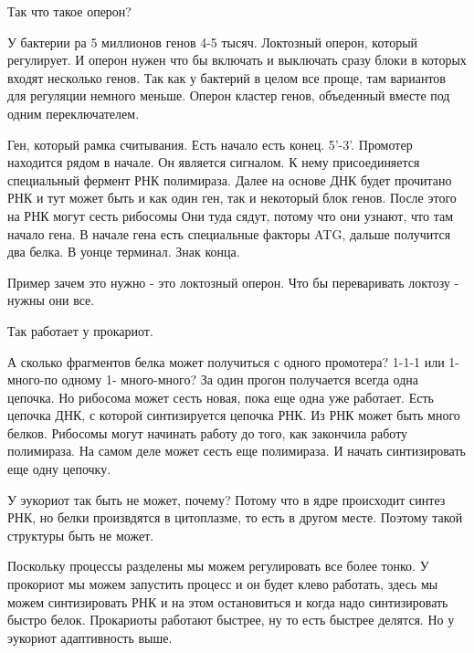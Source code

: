 Так что такое оперон? 

У бактерии ра 5 миллионов генов 4-5 тысяч. Локтозный оперон, 
который регулирует. И оперон нужен что бы включать и 
выключать сразу блоки в которых входят несколько генов. 
Так как у бактерий в целом все проще, там вариантов для регуляции немного 
меньше. Оперон кластер генов, объеденный вместе под одним переключателем. 

Ген, который рамка считывания. Есть начало есть конец. 5'-3'. Промотер 
находится рядом в начале. Он является сигналом. К нему присоединяется 
специальный фермент РНК полимираза.  Далее на основе ДНК будет прочитано 
РНК и тут может быть и как один ген, так и некоторый блок генов. После этого 
на РНК могут сесть рибосомы Они туда сядут, потому что они узнают, что 
там начало гена. В начале гена есть специальные факторы ATG, дальше 
получится два белка. В уонце терминал. Знак конца.

Пример зачем это нужно - это локтозный оперон. Что бы переваривать локтозу - нужны они
все.  

Так работает у прокариот. 

А сколько фрагментов белка может получиться с одного промотера? 
1-1-1 или 1-много-по одному 1- много-много? За один прогон получается 
всегда одна цепочка. Но рибосома может сесть новая, пока еще одна уже работает. 
Есть цепочка ДНК, с которой синтизируется цепочка РНК. Из РНК может 
быть много белков. Рибосомы могут начинать работу до того, 
как закончила работу полимираза. На самом деле может 
сесть еще полимираза. И начать синтизировать еще одну цепочку. 

У эукориот так быть не может, почему? 
Потому что в ядре происходит синтез РНК, но белки произвдятся в цитоплазме, 
то есть в другом месте. Поэтому такой структуры быть не может. 

Поскольку процессы разделены мы можем регулировать все более тонко. 
У прокориот мы можем запустить процесс и он будет клево работать, 
здесь мы можем синтизировать РНК и на этом остановиться и 
когда надо синтизировать быстро белок. Прокариоты работают быстрее, 
ну то есть быстрее делятся. Но у эукориот адаптивность выше. 

